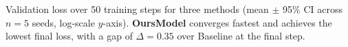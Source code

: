 \caption{Validation loss over 50 training steps for three methods (mean $\pm$ 95\% CI across $n{=}5$ seeds, log-scale $y$-axis). \textbf{OursModel} converges fastest and achieves the lowest final loss, with a gap of $\Delta{=}0.35$ over Baseline at the final step.}

